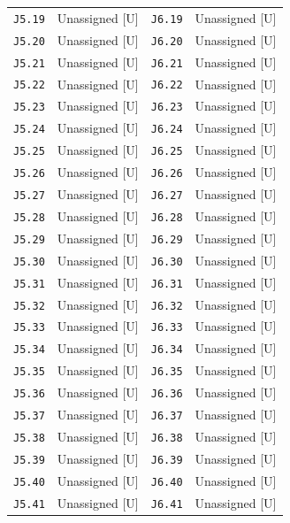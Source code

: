 \documentclass[11pt,a4paper]{article}
\begin{document}
\begin{longtable}{@{}P{27mm}P{55mm}P{27mm}P{55mm}@{}}
\nolinkurl{J5.19} & Unassigned [U] & \nolinkurl{J6.19} & Unassigned [U] \\
\nolinkurl{J5.20} & Unassigned [U] & \nolinkurl{J6.20} & Unassigned [U] \\
\nolinkurl{J5.21} & Unassigned [U] & \nolinkurl{J6.21} & Unassigned [U] \\
\nolinkurl{J5.22} & Unassigned [U] & \nolinkurl{J6.22} & Unassigned [U] \\
\nolinkurl{J5.23} & Unassigned [U] & \nolinkurl{J6.23} & Unassigned [U] \\
\nolinkurl{J5.24} & Unassigned [U] & \nolinkurl{J6.24} & Unassigned [U] \\
\nolinkurl{J5.25} & Unassigned [U] & \nolinkurl{J6.25} & Unassigned [U] \\
\nolinkurl{J5.26} & Unassigned [U] & \nolinkurl{J6.26} & Unassigned [U] \\
\nolinkurl{J5.27} & Unassigned [U] & \nolinkurl{J6.27} & Unassigned [U] \\
\nolinkurl{J5.28} & Unassigned [U] & \nolinkurl{J6.28} & Unassigned [U] \\
\nolinkurl{J5.29} & Unassigned [U] & \nolinkurl{J6.29} & Unassigned [U] \\
\nolinkurl{J5.30} & Unassigned [U] & \nolinkurl{J6.30} & Unassigned [U] \\
\nolinkurl{J5.31} & Unassigned [U] & \nolinkurl{J6.31} & Unassigned [U] \\
\nolinkurl{J5.32} & Unassigned [U] & \nolinkurl{J6.32} & Unassigned [U] \\
\nolinkurl{J5.33} & Unassigned [U] & \nolinkurl{J6.33} & Unassigned [U] \\
\nolinkurl{J5.34} & Unassigned [U] & \nolinkurl{J6.34} & Unassigned [U] \\
\nolinkurl{J5.35} & Unassigned [U] & \nolinkurl{J6.35} & Unassigned [U] \\
\nolinkurl{J5.36} & Unassigned [U] & \nolinkurl{J6.36} & Unassigned [U] \\
\nolinkurl{J5.37} & Unassigned [U] & \nolinkurl{J6.37} & Unassigned [U] \\
\nolinkurl{J5.38} & Unassigned [U] & \nolinkurl{J6.38} & Unassigned [U] \\
\nolinkurl{J5.39} & Unassigned [U] & \nolinkurl{J6.39} & Unassigned [U] \\
\nolinkurl{J5.40} & Unassigned [U] & \nolinkurl{J6.40} & Unassigned [U] \\
\nolinkurl{J5.41} & Unassigned [U] & \nolinkurl{J6.41} & Unassigned [U] \\

\end{longtable}
\end{document}
